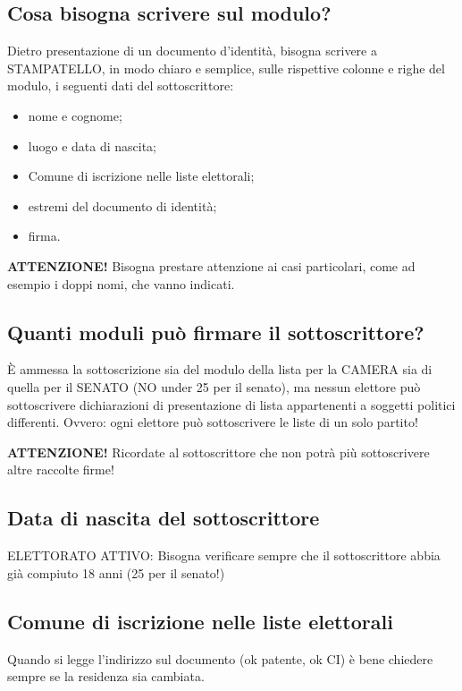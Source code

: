\documentclass[paper=a4,11pt]{scrartcl}
\begin{document}
\subsection{Cosa bisogna scrivere sul modulo?}
Dietro presentazione di un documento d’identità, bisogna scrivere a 
STAMPATELLO, in modo chiaro e
semplice, sulle rispettive colonne e righe del modulo, i seguenti dati del 
sottoscrittore:\begin{itemize}
\item nome e cognome;
\item luogo e data di nascita;
\item Comune di iscrizione nelle liste elettorali;
\item estremi del documento di identità;
\item firma.\end{itemize}

\begin{leftbar}\textbf{ATTENZIONE!} Bisogna prestare attenzione ai casi particolari, come ad esempio i 
doppi nomi, che vanno indicati.\end{leftbar}

\subsection{Quanti moduli può firmare il sottoscrittore?}
È ammessa la sottoscrizione sia del modulo della lista per la CAMERA sia di 
quella per il SENATO (NO under 25 per il senato), ma nessun elettore può 
sottoscrivere dichiarazioni di presentazione di lista appartenenti a
soggetti politici differenti. Ovvero: ogni elettore può sottoscrivere le liste 
di un solo partito!

\begin{leftbar}\textbf{ATTENZIONE!} Ricordate al sottoscrittore che non potrà più sottoscrivere altre raccolte 
firme!\end{leftbar}

\subsection{Data di nascita del sottoscrittore}
ELETTORATO ATTIVO: Bisogna verificare sempre che il sottoscrittore abbia già 
compiuto 18 anni (25 per il senato!)

\subsection{Comune di iscrizione nelle liste elettorali}
Quando si legge l’indirizzo sul documento (ok patente, ok CI) è bene chiedere 
sempre se la residenza sia cambiata.
\end{document}
